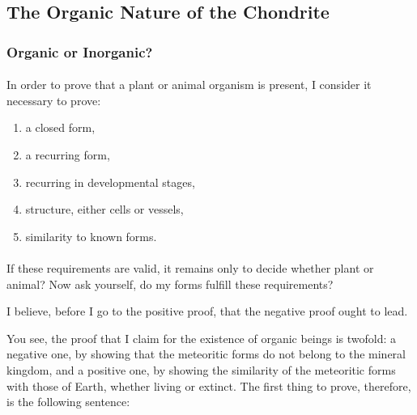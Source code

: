 \documentclass[a4paper, 12pt, oneside]{article}
\begin{document}
\subsection{The Organic Nature of the Chondrite}
\subsubsection{Organic or Inorganic?}
\paragraph*{}
In order to prove that a plant or animal organism is present, I consider it necessary to prove:
\begin{enumerate}
    \item a closed form,
    \item a recurring form,
    \item recurring in developmental stages,
    \item structure, either cells or vessels,
    \item similarity to known forms.
\end{enumerate}
\paragraph*{}
If these requirements are valid, it remains only to decide whether plant or animal? Now ask yourself, do my forms fulfill these requirements?

I believe, before I go to the positive proof, that the negative proof ought to lead.

You see, the proof that I claim for the existence of organic beings is twofold: a negative one, by showing that the meteoritic forms do not belong to the mineral kingdom, and a positive one, by showing the similarity of the meteoritic forms with those of Earth, whether living or extinct. The first thing to prove, therefore, is the following sentence:
\end{document}

